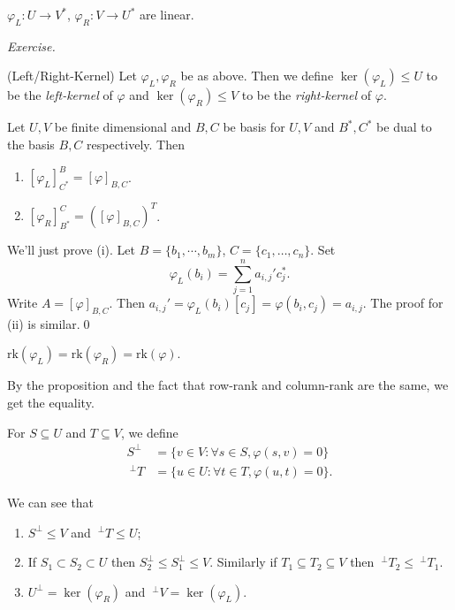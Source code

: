 \documentclass{article}
\newcommand{\rk}{\mathrm{rk}}
\begin{document}
\begin{lemma}
  $ \varphi_L:U\to V^* $, $ \varphi_R:V\to U^* $ are linear.
\end{lemma}
\pf \textit{Exercise.}
\begin{definition}
	(Left/Right-Kernel) Let $ \varphi_L,\varphi_R $ be as above. Then we define $ \ker(\varphi_L)\le U $ to be the \textit{left-kernel} of $ \varphi $ and $ \ker(\varphi_R)\le V $ to be the \textit{right-kernel} of $ \varphi $.
\end{definition}
\begin{proposition}
  Let $ U,V $ be finite dimensional and $ B,C $ be basis for $ U,V $ and $ B^*,C^* $ be dual to the basis $ B,C $ respectively. Then
  \begin{enumerate}
	  \item $ [\varphi_L]^B_{C^*}=[\varphi]_{B,C} $. 
	  \item $ [\varphi_R]^C_{B^*}=([\varphi]_{B,C})^T $.
  \end{enumerate}  
\end{proposition}
\pf We'll just prove (i). Let $ B=\{b_1,\cdots, b_m\} $, $ C=\{ c_1,\dots, c_n\} $. Set
\[
	\varphi_L(b_i)=\sum_{j=1}^na_{i,j}'c^*_j.
\]
Write $ A=[\varphi]_{B,C} $. Then $ a_{i,j}'=\varphi_L(b_i)[c_j]=\varphi(b_i,c_j)=a_{i,j} $. The proof for (ii) is similar.\qed
\begin{corollary}
  $ \rk(\varphi_L)=\rk(\varphi_R)=\rk(\varphi) $.
\end{corollary}
\pf By the proposition and the fact that row-rank and column-rank are the same, we get the equality.
\begin{definition}
  For $ S\subseteq U $ and $ T\subseteq V $, we define
  \begin{align*}
	  S^{\perp}&=\{v\in V: \forall s\in S, \varphi(s,v)=0\}\\
	  {\ }^{\perp}T&=\{u\in U: \forall t\in T, \varphi(u,t)=0\}.
  \end{align*}
\end{definition}
\begin{remark}
  We can see that
  \begin{enumerate}
	  \item $ S^\perp \le V $ and $ \ ^\perp T\le U $;
	  \item If $ S_1\subset S_2\subset U $ then $ S_2^\perp\le S^\perp_1\le V $. Similarly if $ T_1\subseteq T_2\subseteq V $ then $ \ ^\perp T_2\le \ ^\perp T_1 $.
	  \item $ U^\perp = \ker(\varphi_R) $ and $ \ ^\perp V=\ker (\varphi_L) $.
  \end{enumerate}
\end{remark}
\end{document}
